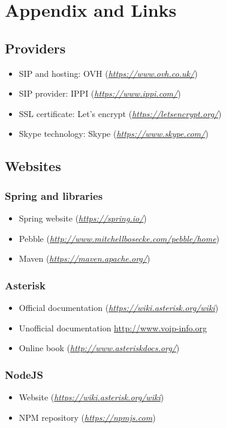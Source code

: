 \chapter{Appendix and Links}

\section{Providers}
\begin{itemize}  
\item SIP and hosting:  OVH (\textit{\url{https://www.ovh.co.uk/}})
\item SIP provider:     IPPI (\textit{\url{https://www.ippi.com/}})
\item SSL certificate:  Let's encrypt (\textit{\url{https://letsencrypt.org/}})
\item Skype technology: Skype (\textit{\url{https://www.skype.com/}})
\end{itemize}

\section{Websites}

\subsection{Spring and libraries}
\begin{itemize}
\item Spring website (\textit{\url{https://spring.io/}})
\item Pebble (\textit{\url{http://www.mitchellbosecke.com/pebble/home}})
\item Maven (\textit{\url{https://maven.apache.org/}})
\end{itemize}

\subsection{Asterisk}
\begin{itemize}
\item Official documentation (\textit{\url{https://wiki.asterisk.org/wiki}})
\item Unofficial documentation \url{http://www.voip-info.org}
\item Online book (\textit{\url{http://www.asteriskdocs.org/}})
\end{itemize}

\subsection{NodeJS}
\begin{itemize}
\item Website (\textit{\url{https://wiki.asterisk.org/wiki}})
\item NPM repository (\textit{\url{https://npmjs.com}})
\end{itemize}





